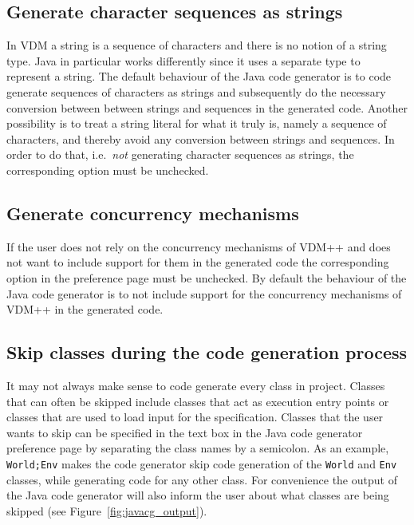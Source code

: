 \documentclass{overturerepchap}
\begin{document}
\subsection{Generate character sequences as strings}

In VDM a string is a sequence of characters and there is no notion of a string type. Java in particular works differently since it uses a separate type to represent a string. The default behaviour of the Java code generator is to code generate sequences of characters as strings and subsequently do the necessary conversion between between strings and sequences in the generated code. Another possibility is to treat a string literal for what it truly is, namely a sequence of characters, and thereby avoid any conversion between strings and sequences. In order to do that, i.e.\ \textit{not} generating character sequences as strings, the corresponding option must be unchecked.

\subsection{Generate concurrency mechanisms}

If the user does not rely on the concurrency mechanisms of VDM++ and does not want to include support for them in the generated code the corresponding option in the preference page must be unchecked. By default the behaviour of the Java code generator is to not include support for the concurrency mechanisms of VDM++ in the generated code.

\subsection{Skip classes during the code generation process}

It may not always make sense to code generate every class in project. Classes that can often be skipped include classes that act as execution entry points or classes that are used to load input for the specification. Classes that the user wants to skip can be specified in the text box in the Java code generator preference page by separating the class names by a semicolon. As an example, \texttt{World;Env} makes the code generator skip code generation of the \texttt{World} and \texttt{Env} classes, while generating code for any other class. For convenience the output of the Java code generator will also inform the user about what classes are being skipped (see Figure~\ref{fig:javacg_output}).
\end{document}

